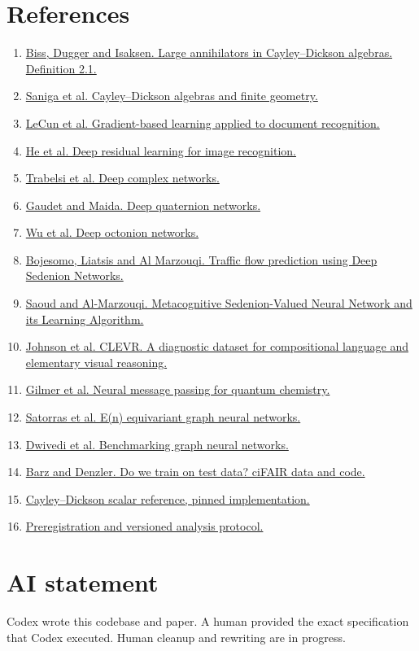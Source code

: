 \documentclass[10pt]{article}
\begin{document}
\section*{References}
\begin{enumerate}\setlength{\itemsep}{1pt}
\item \href{https://arxiv.org/abs/math/0511691}{Biss, Dugger and Isaksen. Large annihilators in Cayley--Dickson algebras. Definition 2.1.}
\item \href{https://arxiv.org/abs/1405.6888}{Saniga et al. Cayley--Dickson algebras and finite geometry.}
\item \href{https://leon.bottou.org/papers/lecun-98h}{LeCun et al. Gradient-based learning applied to document recognition.}
\item \href{https://arxiv.org/abs/1512.03385}{He et al. Deep residual learning for image recognition.}
\item \href{https://arxiv.org/abs/1705.09792}{Trabelsi et al. Deep complex networks.}
\item \href{https://arxiv.org/abs/1712.04604}{Gaudet and Maida. Deep quaternion networks.}
\item \href{https://arxiv.org/abs/1903.08478}{Wu et al. Deep octonion networks.}
\item \href{https://arxiv.org/abs/2012.03874}{Bojesomo, Liatsis and Al Marzouqi. Traffic flow prediction using Deep Sedenion Networks.}
\item \href{https://doi.org/10.1109/ACCESS.2020.3014690}{Saoud and Al-Marzouqi. Metacognitive Sedenion-Valued Neural Network and its Learning Algorithm.}
\item \href{https://cs.stanford.edu/people/jcjohns/clevr/}{Johnson et al. CLEVR. A diagnostic dataset for compositional language and elementary visual reasoning.}
\item \href{https://proceedings.mlr.press/v70/gilmer17a.html}{Gilmer et al. Neural message passing for quantum chemistry.}
\item \href{https://proceedings.mlr.press/v139/satorras21a.html}{Satorras et al. E(n) equivariant graph neural networks.}
\item \href{https://www.jmlr.org/papers/v24/22-0567.html}{Dwivedi et al. Benchmarking graph neural networks.}
\item \href{https://cvjena.github.io/cifair/}{Barz and Denzler. Do we train on test data? ciFAIR data and code.}
\item \href{https://github.com/discretegames/hypercomplex/tree/d026ee205a4bf41f93b5c67df17e212ca3be5de2}{Cayley--Dickson scalar reference, pinned implementation.}
\item \href{https://github.com/BurnyCoder/trigintaduonion-neural-network/blob/4552d4d/reports/preregistration.md}{Preregistration and versioned analysis protocol.}
\end{enumerate}
\section*{AI statement}
Codex wrote this codebase and paper. A human provided the exact specification that Codex executed. Human cleanup and rewriting are in progress.
\end{document}
